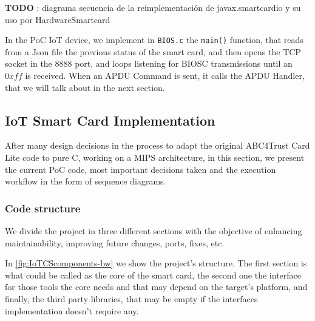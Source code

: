 
\textbf{TODO} :  diagrama secuencia de la reimplementación de javax.smartcardio y su uso por HardwareSmartcard

\hfil


In the PoC IoT device, we implement in \texttt{BIOS.c} the \texttt{main()} function, that reads from a Json file the previous status of the smart card, and then opens the TCP socket in the $8888$ port, and loops listening for BIOSC transmissions until an $0xff$ is received. When an APDU Command is sent, it calls the APDU Handler, that we will talk about in the next section.




\subsection{IoT Smart Card Implementation}


After many design decisions in the process to adapt the original ABC4Trust Card Lite code to pure C, working on a MIPS architecture, in this section, we present the current \ac{PoC} code, most important decisions taken and the execution workflow in the form of sequence diagrams.


\hfil



\subsubsection{Code structure}


We divide the project in three different sections with the objective of enhancing maintainability, improving future changes, ports, fixes, etc.

In \autoref{fig:IoTCScomponents-bw} we show the project's structure. The first section is what could be called as the core of the smart card, the second one the interface for those tools the core needs and that may depend on the target's platform, and finally, the third party libraries, that may be empty if the interfaces implementation doesn't require any.






